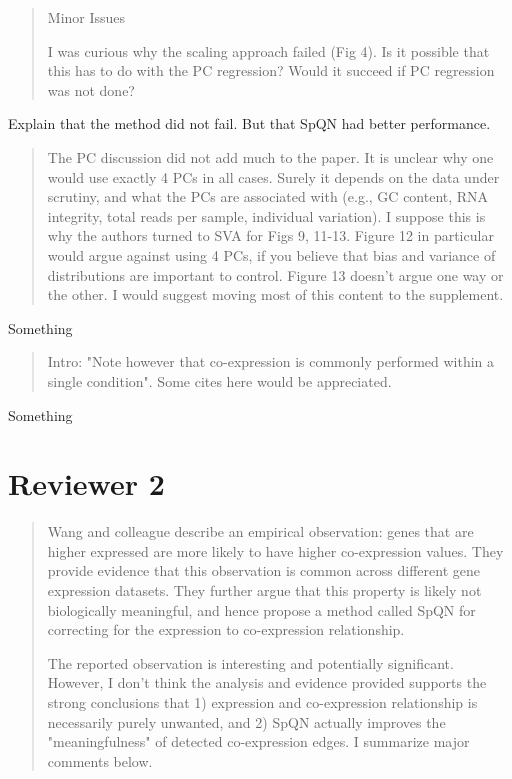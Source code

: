\documentclass[english,letterpaper,pdftex,12pt]{article}
\begin{document}
\begin{quote}
Minor Issues

I was curious why the scaling approach failed (Fig 4). Is it possible that this has to do with the PC regression? Would it succeed if PC regression was not done?
\end{quote}

\begin{response}
  Explain that the method did not fail. But that SpQN had better performance.
\end{response}  

\begin{quote}
The PC discussion did not add much to the paper. It is unclear why one would use exactly 4 PCs in all cases. Surely it depends on the data under scrutiny, and what the PCs are associated with (e.g., GC content, RNA integrity, total reads per sample, individual variation). I suppose this is why the authors turned to SVA for Figs 9, 11-13. Figure 12 in particular would argue against using 4 PCs, if you believe that bias and variance of distributions are important to control. Figure 13 doesn't argue one way or the other. I would suggest moving most of this content to the supplement.
\end{quote}

\begin{response}
  Something
\end{response}  

\begin{quote}
Intro: "Note however that co-expression is commonly performed within a single condition". Some cites here would be appreciated.
\end{quote}

\begin{response}
  Something
\end{response}  

\section*{Reviewer 2}

\begin{quote}
Wang and colleague describe an empirical observation: genes that are higher expressed are more likely to have higher co-expression values. They provide evidence that this observation is common across different gene expression datasets. They further argue that this property is likely not biologically meaningful, and hence propose a method called SpQN for correcting for the expression to co-expression relationship. 

The reported observation is interesting and potentially significant. However, I don't think the analysis and evidence provided supports the strong conclusions that 1) expression and co-expression relationship is necessarily purely unwanted, and 2) SpQN actually improves the "meaningfulness" of detected co-expression edges. I summarize major comments below.
\end{quote}
\end{document}
